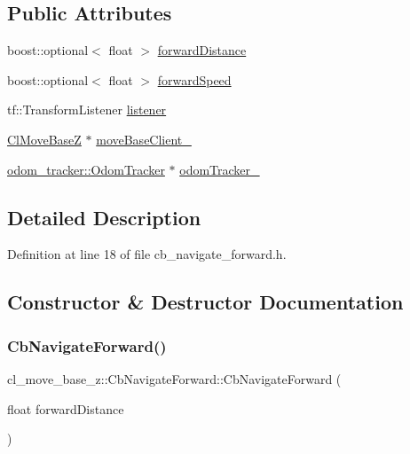 \subsection*{Public Attributes}
\begin{DoxyCompactItemize}
\item 
boost\+::optional$<$ float $>$ \hyperlink{classcl__move__base__z_1_1CbNavigateForward_a41bc9c319c64be6302f7365173ccd2c5}{forward\+Distance}
\item 
boost\+::optional$<$ float $>$ \hyperlink{classcl__move__base__z_1_1CbNavigateForward_acd3a70c0886d7021f37405fb07d96cc9}{forward\+Speed}
\item 
tf\+::\+Transform\+Listener \hyperlink{classcl__move__base__z_1_1CbNavigateForward_a4fcb3933f612a0801bf373fbdeec71f5}{listener}
\item 
\hyperlink{classcl__move__base__z_1_1ClMoveBaseZ}{Cl\+Move\+BaseZ} $\ast$ \hyperlink{classcl__move__base__z_1_1CbNavigateForward_a128b88b91b3f600f5a28480d85405c16}{move\+Base\+Client\+\_\+}
\item 
\hyperlink{classcl__move__base__z_1_1odom__tracker_1_1OdomTracker}{odom\+\_\+tracker\+::\+Odom\+Tracker} $\ast$ \hyperlink{classcl__move__base__z_1_1CbNavigateForward_a7583a4d669af48618bd45950db8e5292}{odom\+Tracker\+\_\+}
\end{DoxyCompactItemize}


\subsection{Detailed Description}


Definition at line 18 of file cb\+\_\+navigate\+\_\+forward.\+h.



\subsection{Constructor \& Destructor Documentation}
\mbox{\label{classcl__move__base__z_1_1CbNavigateForward_a99ad479eeee7116e68cdb41870223eeb}} 
\subsubsection{\texorpdfstring{Cb\+Navigate\+Forward()}{CbNavigateForward()}\hspace{0.1cm}{\footnotesize\ttfamily [1/2]}}
{\footnotesize\ttfamily cl\+\_\+move\+\_\+base\+\_\+z\+::\+Cb\+Navigate\+Forward\+::\+Cb\+Navigate\+Forward (\begin{DoxyParamCaption}\item[{float}]{forward\+Distance }\end{DoxyParamCaption})}



